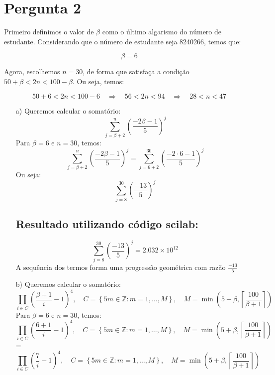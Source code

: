 \chapter{Pergunta 2}

Primeiro definimos o valor de $\beta$ como o último algarismo do número de estudante. Considerando que o número de estudante seja 8240266, temos que:

\[
\beta = 6
\]

Agora, escolhemos $n = 30$, de forma que satisfaça a condição $50 + \beta < 2n < 100 - \beta$. Ou seja, temos:

\[
50 + 6 < 2n < 100 - 6 \quad \Rightarrow \quad 56 < 2n < 94 \quad \Rightarrow \quad 28 < n < 47
\]



\begin{enumerate}


    \item[a)]
    Queremos calcular o somatório:
    \[
    \sum_{j=\beta+2}^{n} \left( \frac{-2\beta-1}{5} \right)^j
    \]
    Para \(\beta = 6\) e \(n = 30\), temos:
    \[
    \sum_{j= \beta+2}^{n} \left( \frac{-2\beta-1}{5} \right)^j = \sum_{j= 6+2}^{30} \left( \frac{-2 \cdot 6 - 1}{5} \right)^j
    \]
    Ou seja:
    \[
    \sum_{j= 8}^{30} \left( \frac{-13}{5} \right)^j
    \]


\section*{Resultado utilizando  código scilab:}
     \[
    \sum_{j= 8}^{30} \left( \frac{-13}{5} \right)^j = 2.032 \times 10^{12}
    \]
A sequência dos termos forma uma progressão geométrica com razão $\frac{-13}{5}$


   \item[b)]
   Queremos calcular o somatório:
   \[
\prod_{i \in C} \left( \frac{\beta + 1}{i } -1\right)^4, \quad C = \left\{ 5m \in \mathbb{Z}: m = 1, \dots, M \right\}, \quad M = \min \left( 5 + \beta, \left\lceil \frac{100}{\beta + 1} \right\rceil \right)
\]
    Para \(\beta = 6\) e \(n = 30\), temos:
     \[
\prod_{i \in C} \left( \frac{6 + 1}{i } -1\right)^4, \quad C = \left\{ 5m \in \mathbb{Z}: m = 1, \dots, M \right\}, \quad M = \min \left( 5 + \beta, \left\lceil \frac{100}{\beta + 1} \right\rceil \right) 
\]
 = \[
\prod_{i \in C} \left( \frac{7}{i }-1 \right)^4, \quad C = \left\{ 5m \in \mathbb{Z}: m = 1, \dots, M \right\}, \quad M = \min \left( 5 + \beta, \left\lceil \frac{100}{\beta + 1} \right\rceil \right) 
\]


\end{enumerate}
